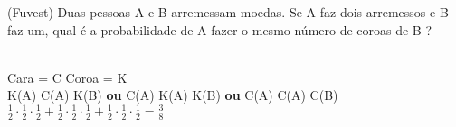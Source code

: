 \begin{ex}
(Fuvest) Duas pessoas A e B arremessam moedas. Se A faz dois arremessos e B faz um, qual é a probabilidade de A fazer o mesmo número de coroas de B ?
    \begin{sol}
      \phantom{A} \\
      Cara = C\hspace{0,5cm}  Coroa = K \\
      K(A) C(A) K(B) \textbf{ou} C(A) K(A) K(B) \textbf{ou} C(A) C(A) C(B) \\
      $\frac{1}{2}\cdot\frac{1}{2}\cdot\frac{1}{2}+\frac{1}{2}\cdot\frac{1}{2}\cdot\frac{1}{2}+\frac{1}{2}\cdot\frac{1}{2}\cdot\frac{1}{2}=\frac{3}{8}$
    \end{sol}
\end{ex}
